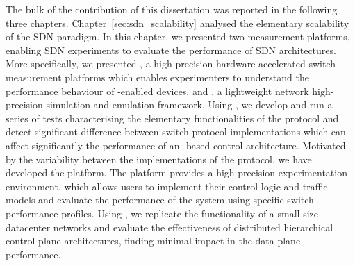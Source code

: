 The bulk of the contribution of this dissertation was reported in the following
three chapters. Chapter~\ref{sec:sdn_scalability} analysed the elementary
scalability of the SDN paradigm. In this chapter, we presented two measurement
platforms, enabling SDN experiments to evaluate the performance of SDN
architectures. More specifically, we presented \oflops, a high-precision
hardware-accelerated \of switch measurement platforms which enables
experimenters to understand the performance behaviour of \of-enabled devices,
and \sdnsim, a lightweight network high-precision simulation and emulation
framework. Using \oflops, we develop and run a series of tests characterising the
elementary functionalities of the \of protocol and detect significant difference
between switch protocol implementations which can affect significantly the 
performance of an \of-based control architecture. Motivated by the variability
between the implementations  of the \of protocol, we have developed the \sdnsim
platform. The \sdnsim platform provides a high precision experimentation
environment, which allows users to implement their control logic and traffic
models and evaluate the performance of the system using specific switch
performance profiles. Using \sdnsim, we replicate the functionality of a small-size 
datacenter networks and evaluate the effectiveness of distributed hierarchical
control-plane architectures, finding minimal impact in the data-plane
performance.  


